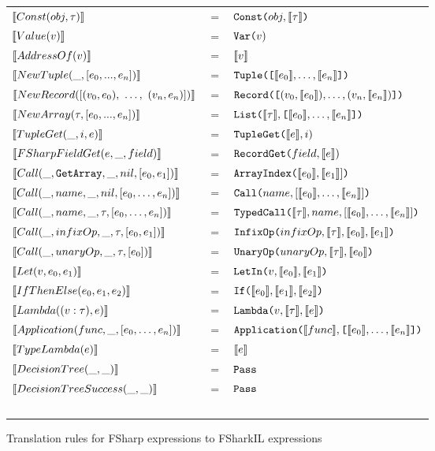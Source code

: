 \begin{figure}[H]
  \centering
  \begin{tabular}{@{}l c l}%
  $\evals{Const(obj, \tau)}$ & $=$ & $\lit{Const(}obj, \evals{\tau} \lit{)}$ \\
  $\evals{Value(v)}$ & $=$ & $\lit{Var(}v{)}$ \\
  $\evals{AddressOf(v)}$ & $=$ & $\evals{v}$ \\
  $\evals{NewTuple(\_, [e_0,...,e_n])}$ & $=$ & $\lit{Tuple([}\evals{e_0},\ldots, \evals{e_n}\lit{])}$ \\
  $\evals{NewRecord([(v_0 , e_0),~\ldots,~(v_n , e_n)])}$ & $=$ & $\lit{Record([}(v_0,\evals{e_0}),\ldots,(v_n,\evals{e_n})\lit{])}$ \\
  $\evals{NewArray(\tau, [e_0,...,e_n])}$ & $=$ & $\lit{List(}\evals{\tau},\lit{[}\evals{e_0},\ldots, \evals{e_n}\lit{]}\lit{)}$ \\
  $\evals{TupleGet(\_, i, e)}$ & $=$ & $\lit{TupleGet(}\evals{e}, i{)}$ \\
  $\evals{FSharpFieldGet(e, \_, field)}$ & $=$ & $\lit{RecordGet(}field, \evals{e}{)}$ \\
    $\evals{Call(\_, \lit{GetArray}, \_, nil, [e_0, e_1])}$ & $=$ & $\lit{ArrayIndex(}\evals{e_0},\evals{e_1}]\lit{)}$ \\
    $\evals{Call(\_, name, \_, nil, [e_0, \ldots, e_n])}$ & $=$ & $\lit{Call(}name, [\evals{e_0},\ldots,\evals{e_n}]\lit{)}$ \\
    $\evals{Call(\_, name, \_, \tau, [e_0, \ldots, e_n])}$ & $=$ & $\lit{TypedCall(}\evals{\tau},name, [\evals{e_0}, \ldots, \evals{e_n}]\lit{)}$ \\
    $\evals{Call(\_, infixOp, \_, \tau, [e_0, e_1])}$ & $=$ & $\lit{InfixOp(}infixOp, \evals{\tau}, \evals{e_0}, \evals{e_1}\lit{)}$ \\
    $\evals{Call(\_, unaryOp, \_, \tau, [e_0])}$ & $=$ & $\lit{UnaryOp(}unaryOp, \evals{\tau}, \evals{e_0}\lit{)}$ \\
  $\evals{Let(v, e_0, e_1)}$ & $=$ & $\lit{LetIn(}v, \evals{e_0}, \evals{e_1}\lit{)}$ \\
  $\evals{IfThenElse(e_0, e_1, e_2)}$ & $=$ & $\lit{If(}\evals{e_0}, \evals{e_1}, \evals{e_2}\lit{)}$ \\
  $\evals{Lambda((v : \tau), e)}$ & $=$ & $\lit{Lambda(}v, \evals{\tau}, \evals{e} \lit{)}$ \\
  $\evals{Application(func, \_, [e_0, \ldots, e_n])}$ & $=$ & $\lit{Application(}\evals{func}, \lit{[}\evals{e_0},\ldots, \evals{e_n}\lit{])}$ \\
  $\evals{TypeLambda(e)}$ & $=$ & $\evals{e}$ \\
  $\evals{DecisionTree(\_, \_)}$ & $=$ & $\lit{Pass}$ \\
  $\evals{DecisionTreeSuccess(\_, \_)}$ & $=$ & $\lit{Pass}$ \\ ~ \\
\end{tabular}
\caption{Translation rules for FSharp expressions to FSharkIL expressions}
\label{fig:fsharpexprstofsharkexprs}
\end{figure}
  



